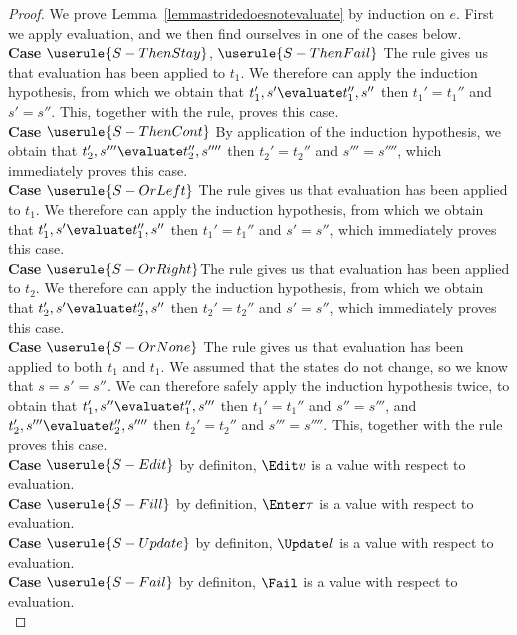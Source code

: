 \begin{proof}
  We prove Lemma~\ref{lemmastridedoesnotevaluate} by induction on $e$. First we
  apply evaluation, and we then find ourselves in one of the cases below.\\

  \noindent\textbf{Case} $\userule{S-ThenStay}$, $\userule{S-ThenFail}$ The  rule gives us that evaluation has been applied to $t_1$. We therefore can apply the induction hypothesis, from which we obtain that $t_1',s'\evaluate t_1'',s''$ then $t_1'=t_1''$ and $s'=s''$. This, together with the  rule, proves this case.\\
  \noindent\textbf{Case} $\userule{S-ThenCont}$ By application of the induction hypothesis, we obtain that $t_2',s'''\evaluate t_2'',s''''$ then $t_2'=t_2''$ and $s'''=s''''$, which immediately proves this case.\\
  \noindent\textbf{Case} $\userule{S-OrLeft}$ The  rule gives us that evaluation has been applied to $t_1$. We therefore can apply the induction hypothesis, from which we obtain that $t_1',s'\evaluate t_1'',s''$ then $t_1'=t_1''$ and $s'=s''$, which immediately proves this case.\\
  \noindent\textbf{Case} $\userule{S-OrRight}$The  rule gives us that evaluation has been applied to $t_2$. We therefore can apply the induction hypothesis, from which we obtain that $t_2',s'\evaluate t_2'',s''$ then $t_2'=t_2''$ and $s'=s''$, which immediately proves this case.\\
  \noindent\textbf{Case} $\userule{S-OrNone}$ The  rule gives us that evaluation has been applied to both $t_1$ and $t_1$. We assumed that the states do not change, so we know that $s=s'=s''$. We can therefore safely apply the induction hypothesis twice, to obtain that $t_1',s''\evaluate t_1'',s'''$ then $t_1'=t_1''$ and $s''=s'''$, and $t_2',s'''\evaluate t_2'',s''''$ then $t_2'=t_2''$ and $s'''=s''''$. This, together with the  rule proves this case.\\
  \noindent\textbf{Case} $\userule{S-Edit}$ by definiton, $\Edit v$ is a value with respect to evaluation.\\
  \noindent\textbf{Case} $\userule{S-Fill}$ by definition, $\Enter \tau$ is a value with respect to evaluation.\\
  \noindent\textbf{Case} $\userule{S-Update}$ by definiton, $\Update l$ is a value with respect to evaluation.\\
  \noindent\textbf{Case} $\userule{S-Fail}$ by definiton, $\Fail$ is a value with respect to evaluation.\\

\end{proof}
